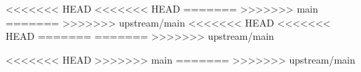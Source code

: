 
<<<<<<< HEAD
<<<<<<< HEAD
=======
>>>>>>> main
=======
>>>>>>> upstream/main
\makeatletter
\newenvironment{info}{%
  \par\medskip
  \noindent\textbf{INFO:}\quad%
  \begin{quote}%
}{%
  \end{quote}\par\medskip
}
\makeatother
<<<<<<< HEAD
<<<<<<< HEAD
=======
=======
>>>>>>> upstream/main

\makeatletter
\newenvironment{note}{%
  \par\medskip
  \noindent\textbf{NOTE:}\quad%
  \begin{quote}%
}{%
  \end{quote}\par\medskip
}
<<<<<<< HEAD
\makeatother
>>>>>>> main
=======
\makeatother
>>>>>>> upstream/main
